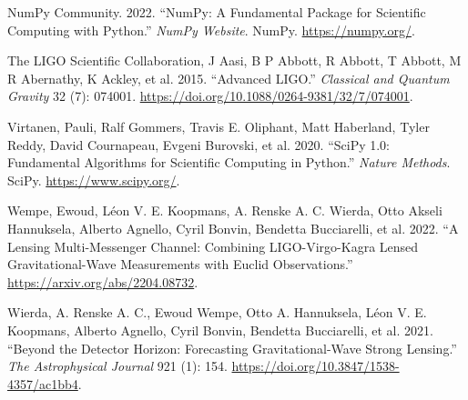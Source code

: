 \documentclass[10pt,a4paper,onecolumn]{article}
\newlength{\cslhangindent}
\newenvironment{CSLReferences}[3] %
 {%
  \setlength{\parindent}{0pt}
  \ifodd #1 \everypar{\setlength{\hangindent}{\cslhangindent}}\ignorespaces\fi
  \ifnum #2 > 0
  \setlength{\parskip}{#2\baselineskip}
  \fi
 }%
 {}
\begin{document}
\begin{CSLReferences}{1}{0}
\bibitem[\citeproctext]{ref-numpy}
NumPy Community. 2022. {``NumPy: A Fundamental Package for Scientific
Computing with Python.''} \emph{NumPy Website}. NumPy.
\url{https://numpy.org/}.

The LIGO Scientific Collaboration, J Aasi, B P Abbott, R Abbott, T
Abbott, M R Abernathy, K Ackley, et al. 2015. {``Advanced LIGO.''}
\emph{Classical and Quantum Gravity} 32 (7): 074001.
\url{https://doi.org/10.1088/0264-9381/32/7/074001}.

Virtanen, Pauli, Ralf Gommers, Travis E. Oliphant, Matt Haberland, Tyler
Reddy, David Cournapeau, Evgeni Burovski, et al. 2020. {``{SciPy 1.0:
Fundamental Algorithms for Scientific Computing in Python}.''}
\emph{Nature Methods}. SciPy. \url{https://www.scipy.org/}.

Wempe, Ewoud, Léon V. E. Koopmans, A. Renske A. C. Wierda, Otto Akseli
Hannuksela, Alberto Agnello, Cyril Bonvin, Bendetta Bucciarelli, et al.
2022. {``A Lensing Multi-Messenger Channel: Combining LIGO-Virgo-Kagra
Lensed Gravitational-Wave Measurements with Euclid Observations.''}
\url{https://arxiv.org/abs/2204.08732}.

Wierda, A. Renske A. C., Ewoud Wempe, Otto A. Hannuksela, Léon V. E.
Koopmans, Alberto Agnello, Cyril Bonvin, Bendetta Bucciarelli, et al.
2021. {``Beyond the Detector Horizon: Forecasting Gravitational-Wave
Strong Lensing.''} \emph{The Astrophysical Journal} 921 (1): 154.
\url{https://doi.org/10.3847/1538-4357/ac1bb4}.

\end{CSLReferences}
\end{document}
